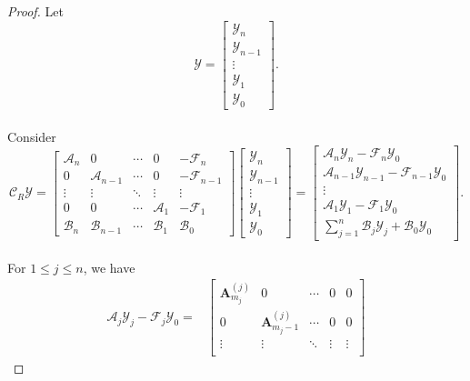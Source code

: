 \documentclass[12pt, reqno]{amsart}
\theoremstyle{definition}
\theoremstyle{remark}
\numberwithin{equation}{section}
\begin{document}
\begin{proof}
\noindent
Let 
\[
\mathcal{Y} = \begin{bmatrix}
    \mathcal{Y}_n \\
    \mathcal{Y}_{n-1} \\
    \vdots \\  
    \mathcal{Y}_1 \\
    \mathcal{Y}_0
\end{bmatrix}.
\]
\\                                                                                           
Consider 
\[
\mathcal{C}_R \mathcal{Y} = \begin{bmatrix}
    \mathcal{A}_n & 0 & \cdots & 0 & -\mathcal{F}_n \\
    0 & \mathcal{A}_{n-1} & \cdots & 0 & -\mathcal{F}_{n-1} \\
    \vdots & \vdots & \ddots & \vdots & \vdots \\
    0 & 0 & \cdots & \mathcal{A}_1 & -\mathcal{F}_1 \\
    \mathcal{B}_n & \mathcal{B}_{n-1} & \cdots & \mathcal{B}_1 & \mathcal{B}_0
\end{bmatrix} \begin{bmatrix}
    \mathcal{Y}_n \\
    \mathcal{Y}_{n-1} \\
    \vdots \\
    \mathcal{Y}_1 \\
    \mathcal{Y}_0
\end{bmatrix} =
\begin{bmatrix} 
    \mathcal{A}_n \mathcal{Y}_n-\mathcal{F}_n\mathcal{Y}_0 \\
    \mathcal{A}_{n-1} \mathcal{Y}_{n-1}-\mathcal{F}_{n-1}\mathcal{Y}_0 \\
    \vdots \\
    \mathcal{A}_1 \mathcal{Y}_1-\mathcal{F}_1\mathcal{Y}_0 \\
    \sum_{j=1}^{n} \mathcal{B}_j \mathcal{Y}_j + \mathcal{B}_0\mathcal{Y}_0
\end{bmatrix}.
\]\\
For $1 \leq j \leq n$, we have 
\begin{align*}
\mathcal{A}_{j} \mathcal{Y}_j-\mathcal{F}_{j}\mathcal{Y}_0= &\begin{bmatrix}
    \textbf{A}_{m_j}^{(j)} & 0 & \cdots & 0 & 0 \\
    0 & \textbf{A}_{m_j -1}^{(j)} & \cdots & 0 & 0 \\
    \vdots & \vdots & \ddots & \vdots & \vdots \\

\end{bmatrix}
\end{align*}
\end{proof}
\end{document}
